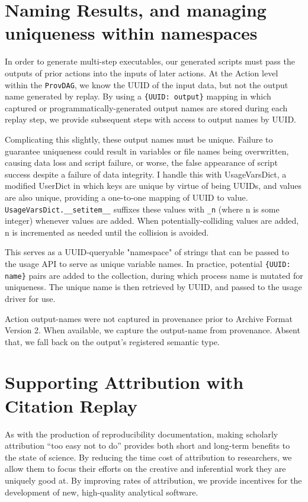 \section{Naming Results, and managing uniqueness within namespaces}

In order to generate multi-step executables, our generated scripts must pass the
outputs of prior actions into the inputs of later actions. At the Action level
within the \texttt{ProvDAG}, we know the UUID of the input data, but not the output name
generated by replay. By using a \texttt{\{UUID: output\}} mapping in which captured or
programmatically-generated output names are stored during each replay step, we
provide subsequent steps with access to output names by UUID.

Complicating this slightly, these output names must be unique. Failure to
guarantee uniqueness could result in variables or file names being overwritten,
causing data loss and script failure, or worse, the false appearance of script
success despite a failure of data integrity. I handle this with UsageVarsDict, a
modified UserDict in which keys are unique by virtue of being UUIDs, and values
are also unique, providing a one-to-one mapping of UUID to value.
\texttt{UsageVarsDict.\_\_setitem\_\_} suffixes these values with \texttt{\_n} (where n is some
integer) whenever values are added. When potentially-colliding values are added,
n is incremented as needed until the collision is avoided. 

This serves as a UUID-queryable "namespace" of strings that can be passed to the
usage API to serve as unique variable names. In practice, potential \texttt{\{UUID: name\}}
pairs are added to the collection, during which process name is mutated for
uniqueness. The unique name is then retrieved by UUID, and passed to the usage
driver for use.

Action output-names were not captured in provenance prior to Archive Format
Version 2. When available, we capture the output-name from provenance. Absent
that, we fall back on the output’s registered semantic type.


\section{Supporting Attribution with Citation Replay}

As with the production of reproducibility documentation, making scholarly
attribution “too easy not to do” provides both short and long-term benefits to
the state of science. By reducing the time cost of attribution to researchers,
we allow them to focus their efforts on the creative and inferential work they
are uniquely good at. By improving rates of attribution, we provide incentives
for the development of new, high-quality analytical software. 

